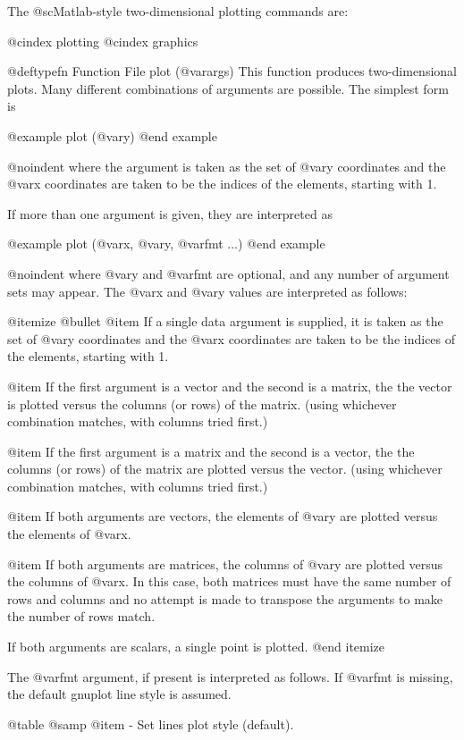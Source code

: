 The @sc{Matlab}-style two-dimensional plotting commands are:

@cindex plotting
@cindex graphics

@deftypefn {Function File} {} plot (@var{args})
This function produces two-dimensional plots.  Many different
combinations of arguments are possible.  The simplest form is

@example
plot (@var{y})
@end example

@noindent
where the argument is taken as the set of @var{y} coordinates and the
@var{x} coordinates are taken to be the indices of the elements,
starting with 1.

If more than one argument is given, they are interpreted as

@example
plot (@var{x}, @var{y}, @var{fmt} ...)
@end example

@noindent
where @var{y} and @var{fmt} are optional, and any number of argument
sets may appear.  The @var{x} and @var{y} values are
interpreted as follows:

@itemize @bullet
@item
If a single data argument is supplied, it is taken as the set of @var{y}
coordinates and the @var{x} coordinates are taken to be the indices of
the elements, starting with 1.

@item
If the first argument is a vector and the second is a matrix, the
the vector is plotted versus the columns (or rows) of the matrix.
(using whichever combination matches, with columns tried first.)

@item
If the first argument is a matrix and the second is a vector, the
the columns (or rows) of the matrix are plotted versus the vector.
(using whichever combination matches, with columns tried first.)

@item
If both arguments are vectors, the elements of @var{y} are plotted versus
the elements of @var{x}.

@item
If both arguments are matrices, the columns of @var{y} are plotted
versus the columns of @var{x}.  In this case, both matrices must have
the same number of rows and columns and no attempt is made to transpose
the arguments to make the number of rows match.

If both arguments are scalars, a single point is plotted.
@end itemize

The @var{fmt} argument, if present is interpreted as follows.  If
@var{fmt} is missing, the default gnuplot line style is assumed.

@table @samp
@item -
Set lines plot style (default).

